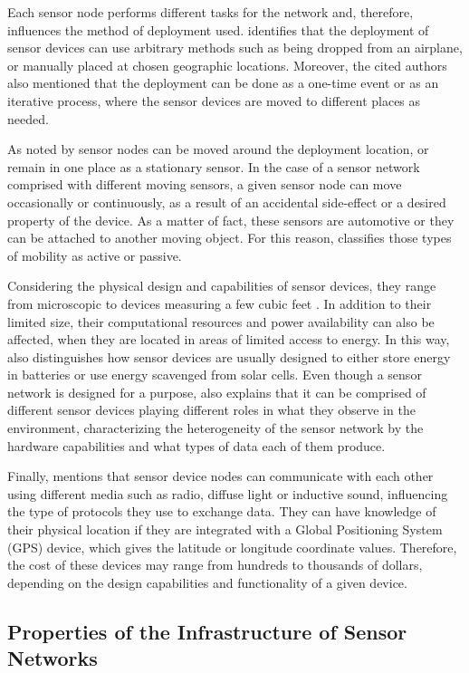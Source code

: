 Each sensor node performs different tasks for the network and, therefore,
influences the method of deployment used. \cite{sn-intro01} identifies that
the deployment of sensor devices can use arbitrary methods such as being
dropped from an airplane, or manually placed at chosen geographic locations.
Moreover, the cited authors also mentioned that the deployment can be done as a
one-time event or as an iterative process, where the sensor devices are moved
to different places as needed.

As noted by \cite{sn-intro01} sensor nodes can be
moved around the deployment location, or remain in one place as a stationary sensor. 
In the case of a sensor network comprised with different
moving sensors, a given sensor node can move occasionally or continuously, as
a result of an accidental side-effect or a desired property of the device. As
a matter of fact, these sensors are automotive or they can be attached to
another moving object. For this reason, \cite{sn-intro01} classifies those
types of mobility as active or passive.

Considering the physical design and capabilities of sensor devices, they range
from microscopic to devices measuring a few cubic feet
\cite{sn-intro02}. In addition to their limited size, their computational
resources and power availability can also be affected, when they are located in
areas of limited access to energy. In this way, \cite{sn-intro01} also
distinguishes how sensor devices are usually designed to either store energy in
batteries or use energy scavenged from solar cells. Even though a sensor
network is designed for a purpose, \cite{sn-intro01} also explains that it can
be comprised of different sensor devices playing different roles in what they
observe in the environment, characterizing the heterogeneity of the sensor
network by the hardware capabilities and what types of data each of them
produce.

Finally, \cite{sn-intro01} mentions that sensor device nodes can communicate
with each other using different media such as radio, diffuse light or
inductive sound, influencing the type of protocols they use to exchange data. They
can have knowledge of their physical location if they are integrated with a
Global Positioning System (GPS) device, which gives the latitude or
longitude coordinate values. Therefore, the cost of these devices may range
from hundreds to thousands of dollars, depending on the design capabilities and functionality of a given device.

\subsection{Properties of the Infrastructure of Sensor Networks}
\label{sec:sn-infrastructure}

